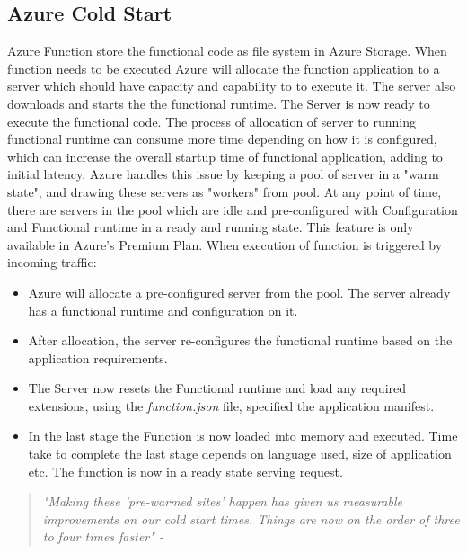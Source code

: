 \documentclass[12pt]{article}
\begin{document}
\begin{flushleft}
\newpage
\subsection{Azure Cold Start}
Azure Function store the functional code as file system in Azure Storage. When function needs to be executed Azure will allocate the function application to a server which should have capacity and capability to to execute it. The server also downloads and starts the the functional runtime. The Server is now ready to execute the functional code. 
\newline
The process of allocation of server to running functional runtime can consume more time depending on how it is configured, which can increase the overall startup time of functional application, adding to initial latency.
\newline
Azure handles this issue by keeping a pool of server in a "warm state", and drawing these servers as "workers" from pool. At any point of time, there are servers in the pool which are idle and pre-configured with Configuration and Functional runtime in a ready and running state. This feature is only available in Azure's Premium Plan.
\newline
When execution of function is triggered by incoming traffic:
\begin{itemize}
    \item Azure will allocate a pre-configured server from the pool. The server already has a functional runtime and configuration on it.
    \item After allocation, the server re-configures the functional runtime based on the application requirements.
    \item The Server now resets the Functional runtime and load any required extensions, using the \textit{function.json} file, specified the application manifest.
    \item In the last stage the Function is now loaded into memory and executed. Time take to complete the last stage depends on language used, size of application etc. The function is now in a ready state serving request.
\end{itemize}
\hfill \break
\begin{flushright}    
\begin{quote}
    \textit{"Making these 'pre-warmed sites' happen has given us measurable improvements on our cold start times. Things are now on the order of three to four times faster" 
 - \cite{Understanding_serverless_cold_start_2018} }
\end{quote}
 \end{flushright}




\end{flushleft}
\end{document}
